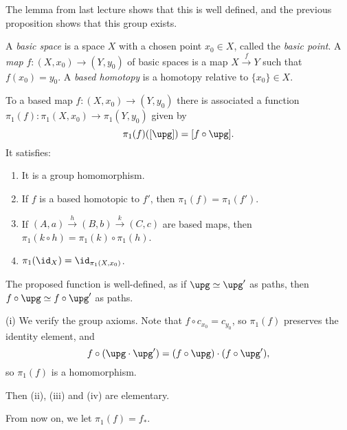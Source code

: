 \documentclass[12pt]{article}
\begin{document}
\begin{proofbox}
	The lemma from last lecture shows that this is well defined, and the previous proposition shows that this group exists.
\end{proofbox}

\begin{definition}
	A \emph{basic space} is a space $X$ with a chosen point $x_0 \in X$, called the \emph{basic point}. A \emph{map} $f : (X, x_0) \to (Y, y_0)$ of basic spaces is a map $X \overset{f}{\to} Y$ such that $f(x_0) = y_0$. A \emph{based homotopy} is a homotopy relative to $\{x_0\} \in X$.
\end{definition}

\begin{proposition}
	To a based map $f : (X, x_0) \to (Y, y_0)$ there is associated a function $\pi_1(f) : \pi_1(X, x_0) \to \pi_1(Y, y_0)$ given by
	\[
		\pi_1(f) ([\upg]) = [f \circ \upg].
	\]
	It satisfies:
	\begin{enumerate}[\normalfont(i)]
		\item It is a group homomorphism.
		\item If $f$ is a based homotopic to $f'$, then $\pi_1(f) = \pi_1(f')$.
		\item If $(A, a) \overset{h}{\to} (B, b) \overset{k}{\to} (C, c)$ are based maps, then $\pi_1(k \circ h) = \pi_1(k) \circ \pi_1(h)$.
		\item $\pi_1(\id_X) = \id_{\pi_1(X, x_0)}$.
	\end{enumerate}
\end{proposition}

\begin{proofbox}
	The proposed function is well-defined, as if $\upg \simeq \upg'$ as paths, then $f \circ \upg \simeq f \circ \upg'$ as paths.

	(i) We verify the group axioms. Note that $f \circ c_{x_0} = c_{y_0}$, so $\pi_1(f)$ preserves the identity element, and
	\[
	f \circ (\upg \cdot \upg') = (f \circ \upg) \cdot (f \circ \upg'),
	\]
	so $\pi_1(f)$ is a homomorphism.

	Then (ii), (iii) and (iv) are elementary.
\end{proofbox}

From now on, we let $\pi_1(f) = f_\ast$.
\end{document}
